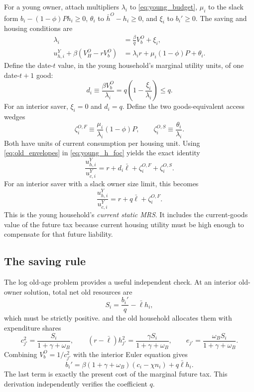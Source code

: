 \documentclass[11pt]{article}
\newcommand{\1}{\mathbf 1}
\newcommand{\ellbar}{\bar\ell}
\begin{document}
For a young owner, attach multipliers $\lambda_i$ to
\eqref{eq:young_budget}, $\mu_i$ to the slack form
$b_i-(1-\phi)Ph_i\ge0$, $\theta_i$ to $\bar h^O-h_i\ge0$, and $\xi_i$ to
$b_i'\ge0$. The saving and housing conditions are
\begin{align}
\lambda_i&=\frac{\beta}{q}V_b^O+\xi_i,
\label{eq:euler_general}\\
u_{h,i}^Y+\beta(V_H^O-rV_b^O)
&=\lambda_i r+\mu_i(1-\phi)P+\theta_i.
\label{eq:young_h_foc}
\end{align}
Define the date-$t$ value, in the young household's marginal utility units, of
one date-$t+1$ good:
\begin{equation}
d_i\equiv\frac{\beta V_b^O}{\lambda_i}
=q\left(1-\frac{\xi_i}{\lambda_i}\right)\le q.
\label{eq:di}
\end{equation}
For an interior saver, $\xi_i=0$ and $d_i=q$. Define the two goods-equivalent
access wedges
\begin{equation}
\zeta_i^{O,F}\equiv
\frac{\mu_i}{\lambda_i}(1-\phi)P,
\qquad
\zeta_i^{O,S}\equiv\frac{\theta_i}{\lambda_i}.
\label{eq:zetas}
\end{equation}
Both have units of current consumption per housing unit. Using
\eqref{eq:old_envelopes} in \eqref{eq:young_h_foc} yields the exact identity
\begin{equation}
\boxed{
\frac{u_{h,i}^Y}{u_{c,i}^Y}
=r+d_i\ellbar+\zeta_i^{O,F}+\zeta_i^{O,S}.}
\label{eq:young_static_mrs}
\end{equation}
For an interior saver with a slack owner size limit, this becomes
\begin{equation}
\frac{u_{h,i}^Y}{u_{c,i}^Y}
=r+q\ellbar+\zeta_i^{O,F}.
\label{eq:young_static_mrs_interior}
\end{equation}
This is the young household's \emph{current static MRS}. It includes the
current-goods value of the future tax because current housing utility must be
high enough to compensate for that future liability.

\subsection{The saving rule}

The log old-age problem provides a useful independent check. At an interior
old-owner solution, total net old resources are
\begin{equation}
S_i=\frac{b_i'}q-\ellbar h_i,
\end{equation}
which must be strictly positive.
and the old household allocates them with expenditure shares
\begin{equation}
c_{j'}^2=\frac{S_i}{1+\gamma+\omega_B},\qquad
(r-\ellbar)h_{j'}^2=\frac{\gamma S_i}{1+\gamma+\omega_B},\qquad
e_{j'}=\frac{\omega_B S_i}{1+\gamma+\omega_B}.
\label{eq:old_shares}
\end{equation}
Combining $V_b^O=1/c_{j'}^2$ with the interior Euler equation gives
\begin{equation}
\boxed{
b_i'=\beta(1+\gamma+\omega_B)(c_i-\chi n_i)
+q\ellbar h_i.}
\label{eq:saving_rule_verified}
\end{equation}
The last term is exactly the present cost of the marginal future tax. This
derivation independently verifies the coefficient $q$.
\end{document}
